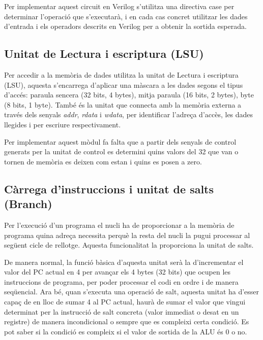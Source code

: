 \documentclass[10pt,a4paper,twocolumn,twoside]{article}
\begin{document}
    Per implementar aquest circuit en Verilog s'utilitza una directiva case per determinar l'operació que s'executarà, i en cada cas concret utilitzar les dades d'entrada i els operadors descrits en Verilog per a obtenir la sortida esperada.
    
    \subsection{Unitat de Lectura i escriptura (LSU)}
    
    Per accedir a la memòria de dades utilitza la unitat de Lectura i escriptura (LSU), aquesta s'encarrega d'aplicar una màscara a les dades segons el tipus d'accés: paraula sencera (32 bits, 4 bytes), mitja paraula (16 bits, 2 bytes), byte (8 bits, 1 byte). També és la unitat que connecta amb la memòria externa a través dels senyals \textit{addr}, \textit{rdata} i \textit{wdata}, per identificar l'adreça d'accès, les dades llegides i per escriure respectivament.
    
    Per implementar aquest mòdul fa falta que a partir dels senyals de control generats per la unitat de control es determini quins valors del 32 que van o tornen de memòria es deixen com estan i quins es posen a zero.
    
    \subsection{ Càrrega d'instruccions i unitat de salts (Branch)}%
    Per l'execució d'un programa el nucli ha de proporcionar a la memòria de programa quina adreça necessita perquè la resta del nucli la pugui processar al següent cicle de rellotge. Aquesta funcionalitat la proporciona la unitat de salts. 
    
    De manera normal, la funció bàsica d'aquesta unitat serà la d'incrementar el valor del PC actual en 4 per avançar els 4 bytes (32 bits) que ocupen les instruccions de programa, per poder processar el codi en ordre i de manera seqüencial. Ara bé, quan s'executa una operació de salt, aquesta unitat ha d'esser capaç de en lloc de sumar 4 al PC actual, haurà de sumar el valor que vingui determinat per la instrucció de salt concreta (valor immediat o desat en un registre) de manera incondicional o sempre que es compleixi certa condició. Es pot saber si la condició es compleix si el valor de sortida de la ALU és 0 o no.
    
\end{document}
